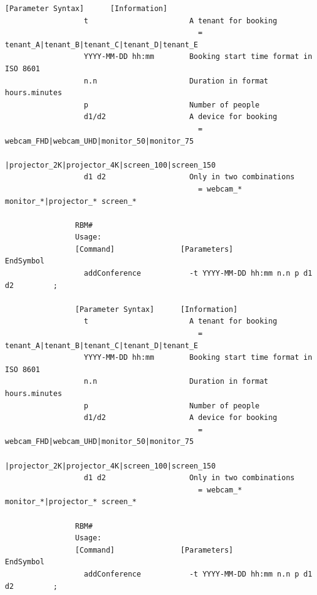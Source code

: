 \documentclass{article}
\begin{document}
\begin{Verbatim}[gobble=8]
                [Parameter Syntax]      [Information]                                         
                  t                       A tenant for booking                                
                                            = tenant_A|tenant_B|tenant_C|tenant_D|tenant_E    
                  YYYY-MM-DD hh:mm        Booking start time format in ISO 8601               
                  n.n                     Duration in format hours.minutes                    
                  p                       Number of people                                    
                  d1/d2                   A device for booking                                
                                            = webcam_FHD|webcam_UHD|monitor_50|monitor_75     
                                              |projector_2K|projector_4K|screen_100|screen_150
                  d1 d2                   Only in two combinations                            
                                            = webcam_* monitor_*|projector_* screen_*         
                
                RBM# 
                Usage: 
                [Command]               [Parameters]                            EndSymbol     
                  addConference           -t YYYY-MM-DD hh:mm n.n p d1 d2         ;           
                
                [Parameter Syntax]      [Information]                                         
                  t                       A tenant for booking                                
                                            = tenant_A|tenant_B|tenant_C|tenant_D|tenant_E    
                  YYYY-MM-DD hh:mm        Booking start time format in ISO 8601               
                  n.n                     Duration in format hours.minutes                    
                  p                       Number of people                                    
                  d1/d2                   A device for booking                                
                                            = webcam_FHD|webcam_UHD|monitor_50|monitor_75     
                                              |projector_2K|projector_4K|screen_100|screen_150
                  d1 d2                   Only in two combinations                            
                                            = webcam_* monitor_*|projector_* screen_*         
                
                RBM# 
                Usage: 
                [Command]               [Parameters]                            EndSymbol     
                  addConference           -t YYYY-MM-DD hh:mm n.n p d1 d2         ;           
                

\end{Verbatim}
\end{document}
